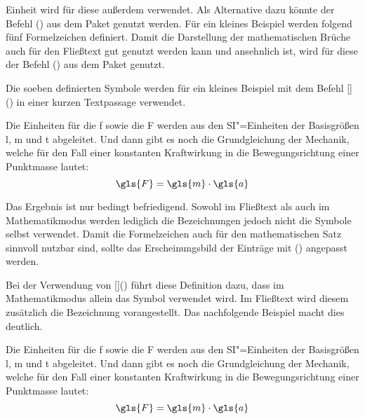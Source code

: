 \documentclass[%
  english,ngerman,%
  cdgeometry=no,DIV=12,%
  cd=false,cdfont=false,cdtitle=true,%
  headings=normal,%
  automark,%
  listof=toc,%
]{tudscrartcl}
\begin{document}
Einheit wird für diese außerdem  verwendet. Als Alternative dazu 
könnte der Befehl () aus dem Paket  
genutzt werden. Für ein kleines Beispiel werden folgend fünf Formelzeichen 
definiert. Damit die Darstellung der mathematischen Brüche auch für den 
Fließtext gut genutzt werden kann und ansehnlich ist, wird für diese der Befehl 
() aus dem Paket  genutzt.
%
\CodeHook{\renewcommand*\newglossaryentry[2]{}}
\begin{Trunk*}

\end{Trunk*}
%
Die soeben definierten Symbole werden für ein kleines Beispiel mit dem Befehl 
[]() in einer kurzen 
Textpassage verwendet.
%
\begin{Hint*}
Die Einheiten für die \gls{f} sowie die \gls{F} werden aus den 
SI"=Einheiten der Basisgrößen \gls{l}, \gls{m} und \gls{t} abgeleitet.
Und dann gibt es noch die Grundgleichung der Mechanik, welche für den
Fall einer konstanten Kraftwirkung in die Bewegungsrichtung einer
Punktmasse lautet:
\[\gls{F} = \gls{m} \cdot \gls{a}\]
\end{Hint*}
%
Das Ergebnis ist nur bedingt befriedigend. Sowohl im Fließtext als auch im 
Mathematikmodus werden lediglich die Bezeichnungen jedoch nicht die Symbole 
selbst verwendet. Damit die Formelzeichen auch für den mathematischen Satz 
sinnvoll nutzbar sind, sollte das Erscheinungsbild der Einträge mit 
() angepasst werden.
%
\begin{Preamble*}
\end{Preamble*}
%
Bei der Verwendung von []() 
führt diese Definition dazu, dass im Mathematikmodus allein das Symbol 
verwendet wird. Im Fließtext wird diesem zusätzlich die Bezeichnung 
vorangestellt. Das nachfolgende Beispiel macht dies deutlich.
%
\begin{Trunk*}
Die Einheiten für die \gls{f} sowie die \gls{F} werden aus den
SI"=Einheiten der Basisgrößen \gls{l}, \gls{m} und \gls{t} abgeleitet.
Und dann gibt es noch die Grundgleichung der Mechanik, welche für den
Fall einer konstanten Kraftwirkung in die Bewegungsrichtung einer
Punktmasse lautet:
\[\gls{F} = \gls{m} \cdot \gls{a}\]

\end{Trunk*}
\end{document}
